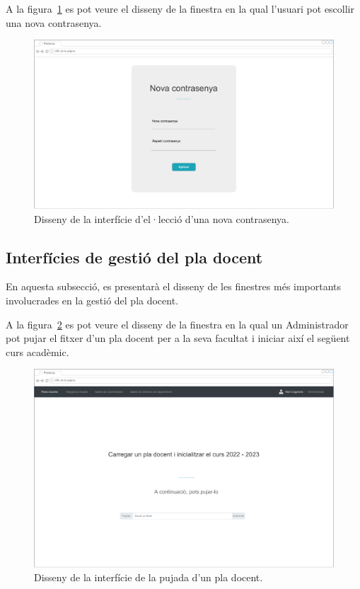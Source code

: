 \documentclass[a4paper,12pt]{ThesisStyle}
\begin{document}
A la figura~\ref{img:newPassword} es pot veure el disseny de la finestra en la qual l'usuari pot escollir una nova contrasenya.
\begin{figure}[H]
	\centering
	\includegraphics[width=\textwidth]{assets/interfaces/auth/newPassword.pdf}
	\caption{\label{img:newPassword}Disseny de la interfície d'el·lecció d'una nova contrasenya.}
\end{figure}

\subsection{Interfícies de gestió del pla docent}
\label{subsec:interficies_plaDocent}

En aquesta subsecció, es presentarà el disseny de les finestres més importants involucrades en la gestió del pla docent.

A la figura~\ref{img:plaDocent_pujada} es pot veure el disseny de la finestra en la qual un Administrador pot pujar el fitxer d'un pla docent per a la seva facultat i iniciar així el següent curs acadèmic. 

\begin{figure}[H]
	\centering
	\includegraphics[width=\textwidth]{assets/interfaces/plaDocent/pujada.pdf}
	\caption{\label{img:plaDocent_pujada}Disseny de la interfície de la pujada d'un pla docent.}
\end{figure}
\end{document}
